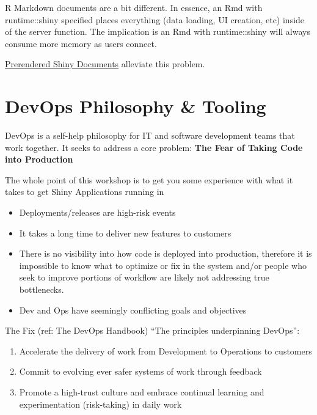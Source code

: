 \documentclass[]{book}
\providecommand{\tightlist}{%
  \setlength{\itemsep}{0pt}\setlength{\parskip}{0pt}}
\theoremstyle{definition}
\theoremstyle{definition}
\theoremstyle{definition}
\theoremstyle{remark}
\begin{document}
R Markdown documents are a bit different. In essence, an Rmd with
runtime::shiny specified places everything (data loading, UI creation,
etc) inside of the server function. The implication is an Rmd with
runtime::shiny will always consume more memory as users connect.

\href{https://rmarkdown.rstudio.com/authoring_shiny_prerendered.html}{Prerendered
Shiny Documents} alleviate this problem.

\hypertarget{devops-philosophy-tooling}{%
\chapter{DevOps Philosophy \& Tooling}\label{devops-philosophy-tooling}}

DevOps is a self-help philosophy for IT and software development teams
that work together. It seeks to address a core problem: \textbf{The Fear
of Taking Code into Production}

The whole point of this workshop is to get you some experience with what
it takes to get Shiny Applications running in

\begin{itemize}
\tightlist
\item
  Deployments/releases are high-risk events
\item
  It takes a long time to deliver new features to customers
\item
  There is no visibility into how code is deployed into production,
  therefore it is impossible to know what to optimize or fix in the
  system and/or people who seek to improve portions of workflow are
  likely not addressing true bottlenecks.
\item
  Dev and Ops have seemingly conflicting goals and objectives
\end{itemize}

The Fix (ref: The DevOps Handbook) ``The principles underpinning
DevOps'':

\begin{enumerate}
\def\labelenumi{\arabic{enumi}.}
\tightlist
\item
  Accelerate the delivery of work from Development to Operations to
  customers
\item
  Commit to evolving ever safer systems of work through feedback
\item
  Promote a high-trust culture and embrace continual learning and
  experimentation (risk-taking) in daily work
\end{enumerate}
\end{document}
